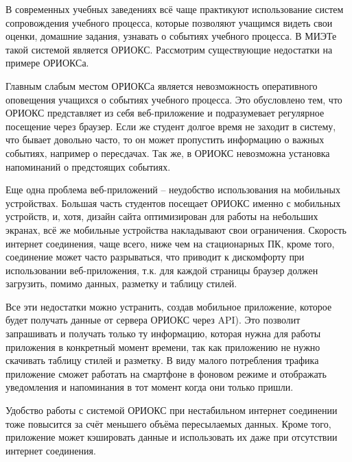 \Introduction
{}
В современных учебных заведениях всё чаще практикуют использование систем  
сопровождения учебного процесса, которые позволяют учащимся видеть свои 
оценки, домашние задания, узнавать о событиях учебного процесса. 
В МИЭТе такой системой является ОРИОКС.
Рассмотрим существующие недостатки на примере ОРИОКСа.

Главным слабым местом ОРИОКСа является невозможность оперативного 
оповещения учащихся о событиях учебного процесса. Это обусловлено тем, что 
ОРИОКС представляет из себя веб-приложение
и подразумевает регулярное посещение через браузер. Если же студент 
долгое время не заходит в систему, что бывает довольно часто, то он может 
пропустить информацию о важных событиях, например о пересдачах. 
Так же, в ОРИОКС невозможна установка напоминаний о предстоящих событиях.

Еще одна проблема веб-приложений – неудобство использования на мобильных 
устройствах. Большая часть студентов посещает ОРИОКС именно с мобильных 
устройств, и, хотя, дизайн сайта оптимизирован для работы на небольших 
экранах, всё же мобильные устройства накладывают свои ограничения. 
Скорость интернет соединения, чаще всего, ниже чем на стационарных ПК,
кроме того, соединение может часто разрываться, что приводит к дискомфорту 
при использовании веб-приложения, т.к. для каждой страницы браузер должен 
загрузить, помимо данных, разметку и таблицу стилей.

Все эти недостатки можно устранить, создав мобильное приложение, которое 
будет получать данные от сервера ОРИОКС через API).
Это позволит запрашивать и получать только ту информацию, которая нужна 
для работы приложения в конкретный момент времени, так как приложению не 
нужно скачивать таблицу стилей и разметку. В виду малого потребления 
трафика приложение сможет работать на смартфоне в фоновом режиме и 
отображать уведомления и напоминания в тот момент когда они только пришли. 

Удобство работы с системой ОРИОКС при нестабильном интернет соединении 
тоже повысится за счёт меньшего объёма пересылаемых данных. Кроме того, 
приложение может кэшировать
данные и использовать их даже при отсутствии интернет соединения.
